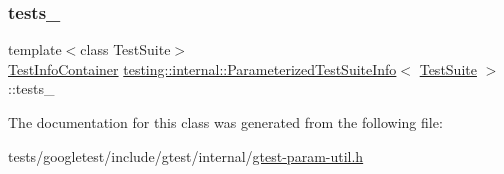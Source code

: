 \mbox{\label{classtesting_1_1internal_1_1ParameterizedTestSuiteInfo_a44e991246e79e6587ffd35533ab4e2d3}} 
\subsubsection{\texorpdfstring{tests\+\_\+}{tests\_}}
{\footnotesize\ttfamily template$<$class Test\+Suite$>$ \\
\hyperlink{classtesting_1_1internal_1_1ParameterizedTestSuiteInfo_a0578de1b5b1852655771349b785d7fb7}{Test\+Info\+Container} \hyperlink{classtesting_1_1internal_1_1ParameterizedTestSuiteInfo}{testing\+::internal\+::\+Parameterized\+Test\+Suite\+Info}$<$ \hyperlink{classtesting_1_1TestSuite}{Test\+Suite} $>$\+::tests\+\_\+\hspace{0.3cm}{\ttfamily [private]}}



The documentation for this class was generated from the following file\+:\begin{DoxyCompactItemize}
\item 
tests/googletest/include/gtest/internal/\hyperlink{gtest-param-util_8h}{gtest-\/param-\/util.\+h}\end{DoxyCompactItemize}
